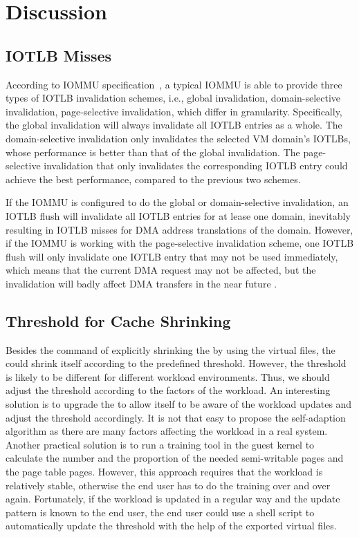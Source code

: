 \section{Discussion}\label{sec:dis}

\subsection{IOTLB Misses}
According to IOMMU specification~\cite{intelvt, amdvt}, a typical IOMMU is able to provide three types of IOTLB invalidation schemes, i.e., global invalidation, domain-selective invalidation, page-selective invalidation, which differ in granularity.
Specifically, the global invalidation will always invalidate all IOTLB entries as a whole.
The domain-selective invalidation only invalidates the selected VM domain's IOTLBs, whose performance is better than that of the global invalidation.
The page-selective invalidation that only invalidates the corresponding IOTLB entry could achieve the best performance, compared to the previous two schemes.

If the IOMMU is configured to do the global or domain-selective invalidation, an IOTLB flush will invalidate all IOTLB entries for at lease one domain, inevitably resulting in IOTLB misses for DMA address translations of the domain. However, if the IOMMU is working with the page-selective invalidation scheme, one IOTLB flush will only invalidate one IOTLB entry that may not be used immediately, which means that the current DMA request may not be affected, but the invalidation will badly affect DMA transfers in the near future .

\subsection{Threshold for \name Cache Shrinking}
Besides the command of explicitly shrinking the \cache by using the virtual files, the \cache could shrink itself according to the predefined threshold.
However, the threshold is likely to be different for different workload environments.
Thus, we should adjust the threshold according to the factors of the workload.
An interesting solution is to upgrade the \cache to allow itself to be aware of the workload updates and adjust the threshold accordingly.
It is not that easy to propose the self-adaption algorithm as there are many factors affecting the workload in a real system.
Another practical solution is to run a training tool in the guest kernel to calculate the number and the proportion of the needed semi-writable pages and the page table pages.
However, this approach requires that the workload is relatively stable, otherwise the end user has to do the training over and over again.
Fortunately, if the workload is updated in a regular way and the update pattern is known to the end user, the end user could use a shell script to automatically update the threshold with the help of the exported virtual files.

